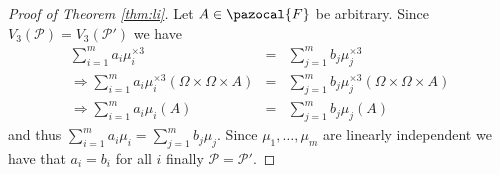 \documentclass[aos]{imsart}
\def\sF{\pazocal{F}}
\def\sP{\mathscr{P}}
\theoremstyle{plain}
\theoremstyle{defintion}
\begin{document}
\begin{proof}[Proof of Theorem \ref{thm:li}]
		Let $A \in \sF$ be arbitrary. Since $V_3\left( \sP \right) = V_3\left( \sP' \right)$ we have
		\begin{eqnarray*}
			\sum_{i=1}^m a_i \mu_i^{\times 3} &=& \sum_{j=1}^m b_j \mu_j^{\times 3}\\
			\Rightarrow \sum_{i=1}^m a_i \mu_i^{\times 3}\left( \Omega \times \Omega \times A \right) &=& \sum_{j=1}^m b_j \mu_j^{\times 3}\left( \Omega \times \Omega \times A \right)\\
			\Rightarrow 
			\sum_{i=1}^m a_i \mu_i\left( A \right) &=& \sum_{j=1}^m b_j \mu_j\left( A \right)
		\end{eqnarray*}
and thus $\sum_{i=1}^m a_i \mu_i = \sum_{j=1}^m b_j \mu_j$. Since $\mu_1,\ldots,\mu_m$ are linearly independent we have that $a_i = b_i$ for all $i$ finally $\sP = \sP'$.
	\end{proof}
\end{document}
